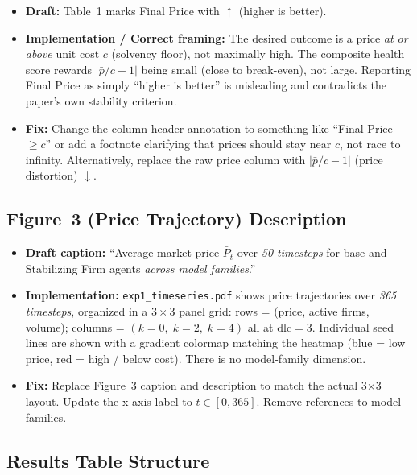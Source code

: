 \documentclass{article}
\begin{document}
\begin{itemize}
  \item \textbf{Draft:} Table~1 marks Final Price with $\uparrow$ (higher is
        better).
  \item \textbf{Implementation / Correct framing:} The desired outcome is a price
        \emph{at or above} unit cost $c$ (solvency floor), not maximally high.
        The composite health score rewards $|\bar{p}/c - 1|$ being small (close to
        break-even), not large.  Reporting Final Price as simply ``higher is
        better'' is misleading and contradicts the paper's own stability criterion.
  \item \textbf{Fix:} Change the column header annotation to something like
        ``Final Price $\geq c$'' or add a footnote clarifying that prices should
        stay near $c$, not race to infinity.  Alternatively, replace the raw price
        column with $|\bar{p}/c - 1|$ (price distortion) $\downarrow$.
\end{itemize}

\subsection{Figure~3 (Price Trajectory) Description}

\begin{itemize}
  \item \textbf{Draft caption:} ``Average market price $\bar{P}_t$ over
        \emph{50 timesteps} for base and Stabilizing Firm agents \emph{across
        model families}.''
  \item \textbf{Implementation:} \texttt{exp1\_timeseries.pdf} shows price
        trajectories over \emph{365 timesteps}, organized in a $3\times3$
        panel grid: rows = (price, active firms, volume); columns = $(k=0,\;
        k=2,\; k=4)$ all at dlc$=3$.  Individual seed lines are shown with a
        gradient colormap matching the heatmap (blue = low price, red = high / below
        cost).  There is no model-family dimension.
  \item \textbf{Fix:} Replace Figure~3 caption and description to match the
        actual 3$\times$3 layout.  Update the x-axis label to $t \in [0, 365]$.
        Remove references to model families.
\end{itemize}

\subsection{Results Table Structure}
\end{document}
